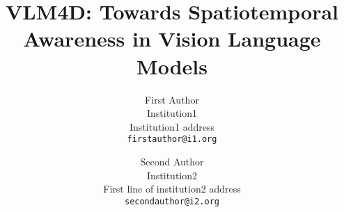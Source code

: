 \documentclass[10pt,twocolumn,letterpaper]{article}
\title{VLM4D: Towards Spatiotemporal Awareness in Vision Language Models}
\author{First Author\\
Institution1\\
Institution1 address\\
{\tt\small firstauthor@i1.org}
\and
Second Author\\
Institution2\\
First line of institution2 address\\
{\tt\small secondauthor@i2.org}
}
\begin{document}
    

\clearpage

{
\small


}

% 
\end{document}
